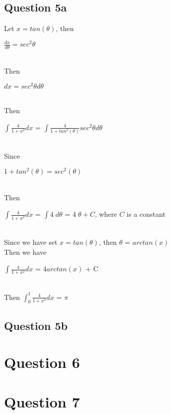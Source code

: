 \documentclass[11pt]{article} %
\begin{document}
\subsection{Question 5a}
Let $x = tan(\theta)$, then\\
\centerline{$\frac{dx}{d\theta} = sec^{2}\theta$}\\
Then\\
\centerline{$dx = sec^{2}\theta d\theta$}\\
Then\\
\centerline{$\int\frac{4}{1+x^2}dx$ = $\int\frac{4}{1+tan^2(\theta)}sec^{2}\theta d\theta$}\\
Since\\
\centerline{$1+tan^2(\theta) = sec^{2}(\theta)$}\\
Then\\
\centerline{$\int\frac{4}{1+x^2}dx$ = $\int 4\;d\theta$ = $4\;\theta + C$, where $C$ is a constant}\\
Since we have set $x = tan(\theta)$, then $\theta$ = $arctan(x)$\\
Then we have \\
\centerline{$\int\frac{4}{1+x^2}dx$ = $4arctan(x)$ + C}\\
Then $\int_{0}^{1}\frac{4}{1+x^2}dx$ = $\pi$
\subsection{Question 5b}

\section{Question 6}
\section{Question 7}
\end{document}
